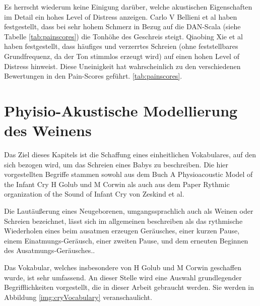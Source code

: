 Es herrscht wiederum keine Einigung darüber, welche akustischen Eigenschaften im Detail ein hohes Level of Distress anzeigen. Carlo V Bellieni et al \cite{dan} haben festgestellt, dass bei sehr hohem Schmerz in Bezug auf die DAN-Scala (siehe Tabelle \ref{tab:painscores}) die Tonhöhe des Geschreis steigt. Qiaobing Xie et al \cite{lod} haben festgestellt, dass häufiges und \glqq verzerrtes\grqq{} Schreien (ohne feststellbares Grundfrequenz, da der Ton stimmlos erzeugt wird)  auf einen hohen Level of Distress hinweist.\cite{signal} Diese Uneinigkeit hat wahrscheinlich zu den verschiedenen Bewertungen in den Pain-Scores geführt. \ref{tab:painscores}.

\section{Phyisio-Akustische Modellierung des Weinens}
\label{sec:acousticModel}

Das Ziel dieses Kapitels ist die Schaffung eines einheitlichen Vokabulares, auf den sich bezogen wird, um das Schreien eines Babys zu beschreiben. Die hier vorgestellten Begriffe stammen sowohl aus dem Buch \glqq A Physioacoustic Model of the Infant Cry \grqq{} H Golub und M Corwin \cite{cryModel} als auch aus dem Paper \glqq Rythmic organization of the Sound of Infant Cry \grqq{} von Zeskind et al.\cite{rythmic}


Die Lautäußerung eines Neugeborenen, umgangssprachlich auch als \glqq Weinen\grqq{} oder \glqq Schreien\grqq{} bezeichnet, lässt sich im allgemeinen beschreiben als das \glqq rythmische Wiederholen eines beim ausatmen erzeugen Geräusches, einer kurzen Pause, einem Einatmungs-Geräusch, einer zweiten Pause, und dem erneuten Beginnen des Ausatmungs-Geräusches.\grqq \cite{wolff}.

Das Vokabular, welches insbesondere von H Golub und M Corwin geschaffen wurde, ist sehr umfassend. An dieser Stelle wird eine Auswahl grundlegender Begrifflichkeiten vorgestellt, die in dieser Arbeit gebraucht werden. Sie werden in Abbildung \ref{img:cryVocabulary} veranschaulicht.

